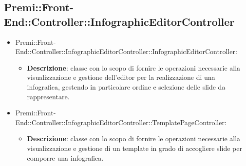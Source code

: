 \subsection{Premi::Front-End::Controller::InfographicEditorController}
	\begin{itemize}
		 \item Premi::Front-End::Controller::InfographicEditorController::InfographicEditorController:
			\begin{itemize}
				\item \textbf{Descrizione}: classe con lo scopo di fornire le operazioni necessarie alla visualizzazione e gestione dell'editor per la realizzazione di una \gls{infografica}, gestendo in particolare ordine e selezione delle \gls{slide} da rappresentare.
			\end{itemize}
		\item  Premi::Front-End::Controller::InfographicEditorController::TemplatePageController: 
			 \begin{itemize}
				\item \textbf{Descrizione}: classe con lo scopo di fornire le operazioni necessarie alla visualizzazione e gestione di un \gls{template} in grado di accogliere \gls{slide} per comporre una \gls{infografica}.
			\end{itemize}
	\end{itemize}
	
